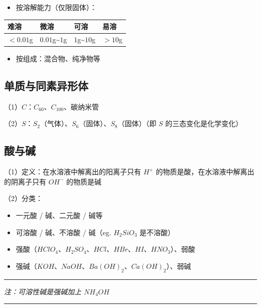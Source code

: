 \documentclass[UTF8,zihao=-4,openany]{ctexbook}
\newenvironment{notebox}
  {\par\smallskip\noindent\begingroup\begin{minipage}{\linewidth}\color{noteframe}\hrule height 0.6pt\smallskip\color{black}\itshape}
  {\par\smallskip\color{noteframe}\hrule height 0.6pt\end{minipage}\endgroup\par\smallskip}
\begin{document}
\begin{itemize}
\item 按溶解能力（仅限固体）：
\end{itemize}

\begin{table}[H]
\centering
\renewcommand{\arraystretch}{1.22}
\begin{tabularx}{\linewidth}{Y Y Y Y}
\toprule
难溶 & 微溶 & 可溶 & 易溶 \\
\midrule
$<0.01$g & $0.01$g\textasciitilde{}$1$g & $1$g\textasciitilde{}$10$g & $>10$g \\
\bottomrule
\end{tabularx}
\end{table}

\begin{itemize}
\item 按组成：混合物、纯净物等
\end{itemize}
\subsection{单质与同素异形体}
（1）$C$：$C_{60}$、$C_{100}$、碳纳米管\par

（2）$S$：$S_2$（气体）、$S_6$（固体）、$S_8$（固体）（即 $S$ 的三态变化是化学变化）\par
\subsection{酸与碱}
（1）定义：在水溶液中解离出的阳离子只有 $H^+$ 的物质是酸，在水溶液中解离出的阴离子只有 $OH^-$ 的物质是碱\par

（2）分类：\par
\begin{itemize}
\item 一元酸 / 碱、二元酸 / 碱等
\end{itemize}

\begin{itemize}
\item 可溶酸 / 碱、不溶酸 / 碱（eg. $H_2SiO_3$ 是不溶酸）
\item 强酸（$HClO_4$、$H_2SO_4$、$HCl$、$HBr$、$HI$、$HNO_3$）、弱酸
\item 强碱（$KOH$、$NaOH$、$Ba(OH)_2$、$Ca(OH)_2$）、弱碱
\end{itemize}
\begin{notebox}
注：可溶性碱是强碱加上 $NH_4OH$\par
\end{notebox}
\end{document}
